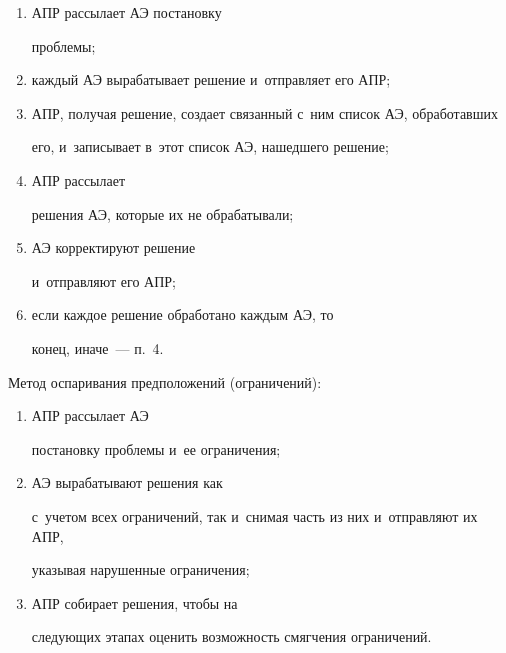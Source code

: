   \begin{enumerate}[(1)]


  \item АПР рассылает АЭ постановку 


проблемы;\\[-10pt]  


\item каждый АЭ вырабатывает решение и~отправляет его АПР;\\[-10pt]  


\item АПР, получая решение, создает связанный с~ним список АЭ, обработавших 


его, и~записывает в~этот список АЭ, нашедшего решение;\\[-10pt]  


\item АПР рассылает 


решения АЭ, которые их не обрабатывали; \\[-10pt] 


\item АЭ корректируют решение 


и~отправляют его АПР; \\[-10pt] 


\item если каждое решение обработано каждым АЭ, то 


конец, иначе~--- п.~4.


  \end{enumerate}


  


  Метод оспаривания предположений (ограничений): 


  \begin{enumerate}[(1)]


  \item АПР рассылает АЭ 


постановку проблемы и~ее ограничения;\\[-10pt]  


\item АЭ вырабатывают решения как 


с~учетом всех ограничений, так и~снимая часть из них и~от\-прав\-ля\-ют их АПР, 


указывая нарушенные ограничения;\\[-10pt]  


\item АПР собирает решения, чтобы на 


следующих этапах оценить возможность смягчения ограничений.


  \end{enumerate}


